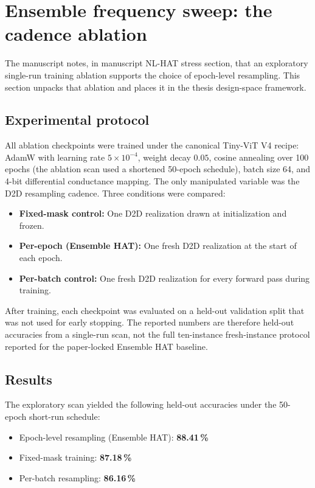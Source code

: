 \section{Ensemble frequency sweep: the cadence ablation}
\label{sec:frequency-sweep}

The manuscript notes, in manuscript NL-HAT stress section, that an exploratory single-run training ablation supports the choice of epoch-level resampling. This section unpacks that ablation and places it in the thesis design-space framework.

\subsection{Experimental protocol}

All ablation checkpoints were trained under the canonical Tiny-ViT V4 recipe: AdamW with learning rate $5\times10^{-4}$, weight decay $0.05$, cosine annealing over 100 epochs (the ablation scan used a shortened 50-epoch schedule), batch size 64, and 4-bit differential conductance mapping. The only manipulated variable was the D2D resampling cadence. Three conditions were compared:

\begin{itemize}[leftmargin=1.4em]
    \item \textbf{Fixed-mask control:} One D2D realization drawn at initialization and frozen.
    \item \textbf{Per-epoch (Ensemble HAT):} One fresh D2D realization at the start of each epoch.
    \item \textbf{Per-batch control:} One fresh D2D realization for every forward pass during training.
\end{itemize}

After training, each checkpoint was evaluated on a held-out validation split that was not used for early stopping. The reported numbers are therefore held-out accuracies from a single-run scan, not the full ten-instance fresh-instance protocol reported for the paper-locked Ensemble HAT baseline.

\subsection{Results}

The exploratory scan yielded the following held-out accuracies under the 50-epoch short-run schedule:
\begin{itemize}[leftmargin=1.4em]
    \item Epoch-level resampling (Ensemble HAT): \textbf{88.41\,\%}
    \item Fixed-mask training: \textbf{87.18\,\%}
    \item Per-batch resampling: \textbf{86.16\,\%}
\end{itemize}

